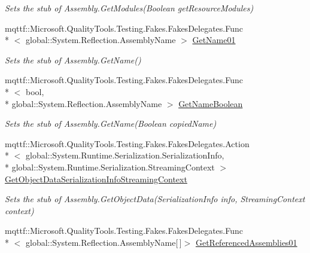 \begin{DoxyCompactItemize}
\begin{DoxyCompactList}\small\item\em Sets the stub of Assembly.\-Get\-Modules(\-Boolean get\-Resource\-Modules)\end{DoxyCompactList}\item 
mqttf\-::\-Microsoft.\-Quality\-Tools.\-Testing.\-Fakes.\-Fakes\-Delegates.\-Func\\*
$<$ global\-::\-System.\-Reflection.\-Assembly\-Name $>$ \hyperlink{class_system_1_1_reflection_1_1_fakes_1_1_stub_assembly_a3b3644bbaab5e8b90d55c27c2b36f299}{Get\-Name01}
\begin{DoxyCompactList}\small\item\em Sets the stub of Assembly.\-Get\-Name()\end{DoxyCompactList}\item 
mqttf\-::\-Microsoft.\-Quality\-Tools.\-Testing.\-Fakes.\-Fakes\-Delegates.\-Func\\*
$<$ bool, \\*
global\-::\-System.\-Reflection.\-Assembly\-Name $>$ \hyperlink{class_system_1_1_reflection_1_1_fakes_1_1_stub_assembly_a33fef10eaa6dc9248dc41cee4ba59d79}{Get\-Name\-Boolean}
\begin{DoxyCompactList}\small\item\em Sets the stub of Assembly.\-Get\-Name(\-Boolean copied\-Name)\end{DoxyCompactList}\item 
mqttf\-::\-Microsoft.\-Quality\-Tools.\-Testing.\-Fakes.\-Fakes\-Delegates.\-Action\\*
$<$ global\-::\-System.\-Runtime.\-Serialization.\-Serialization\-Info, \\*
global\-::\-System.\-Runtime.\-Serialization.\-Streaming\-Context $>$ \hyperlink{class_system_1_1_reflection_1_1_fakes_1_1_stub_assembly_ae5b6f1a1963fa7cfa7d3bb809ce10da7}{Get\-Object\-Data\-Serialization\-Info\-Streaming\-Context}
\begin{DoxyCompactList}\small\item\em Sets the stub of Assembly.\-Get\-Object\-Data(\-Serialization\-Info info, Streaming\-Context context)\end{DoxyCompactList}\item 
mqttf\-::\-Microsoft.\-Quality\-Tools.\-Testing.\-Fakes.\-Fakes\-Delegates.\-Func\\*
$<$ global\-::\-System.\-Reflection.\-Assembly\-Name\mbox{[}$\,$\mbox{]}$>$ \hyperlink{class_system_1_1_reflection_1_1_fakes_1_1_stub_assembly_a6da2bc6677f3887addc1c6f676ef32b7}{Get\-Referenced\-Assemblies01}

\end{DoxyCompactItemize}
